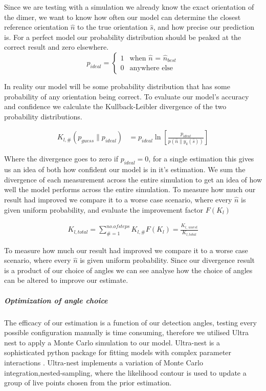 \documentclass[11pt]{article}
\begin{document}
	Since we are testing with a simulation we already know the exact orientation of the dimer, we want to know how often our model can determine the closest reference orientation $\hat{n}$ to the true orientation $\hat{s}$, and how precise our prediction is. For a perfect model our probability distribution should be peaked at the correct result and zero elsewhere.
	\begin{equation}
		p_{ideal}=
		\begin{cases}
			1 & \text{when $\hat{n}$ = $\hat{n}_{best}$}\\
			0 & \text{anywhere else}
		\end{cases}
	\end{equation}

	In reality our model will be some probability distribution that has some probability of any orientation being correct. To evaluate our model's accuracy and confidence we calculate the Kullback-Leibler divergence of the two probability distributions. 
	
	\begin{align}
		K_{l, \#}(p_{guess} \parallel p_{ideal}) &= 
		p_{ideal} \ln \left[
		\frac{p_{ideal}}{p(\hat{n}\parallel y_k(\hat{s}))}
		\right]
	\end{align}

	Where the divergence goes to zero if $p_{ideal}=0$, for a single estimation this gives us an idea of both how confident our model is in it's estimation. We sum the divergence of each measurement across the entire simulation to get an idea of how well the model performs across the entire simulation. To measure how much our result had improved we compare it to a worse case scenario, where every $\hat{n}$ is given uniform probability, and evaluate the improvement factor $F(K_l)$
	
	\begin{align}
		K_{l,total} = \sum\limits_{\# =1}^{no. of steps} K_{l,\#}
		F(K_l) = \frac{K_{l,\ worst}}{K_{l,total}}
	\end{align}

	To measure how much our result had improved we compare it to a worse case scenario, where every $\hat{n}$ is given uniform probability. Since our divergence result is a product of our choice of angles we can see analyse how the choice of angles can be altered to improve our estimate.   

	\subparagraph*{Optimization of angle choice}
	The efficacy of our estimation is a function of our detection angles, testing every possible configuration manually is time consuming, therefore we utilised Ultra nest to apply a Monte Carlo simulation to our model. Ultra-nest is a sophisticated python package for fitting models with complex parameter interactions \cite{Ultranest}. Ultra-nest implements a variation of Monte Carlo integration,nested-sampling, where the likelihood contour is used to update a group of live points chosen from the prior estimation.
	
\end{document}
